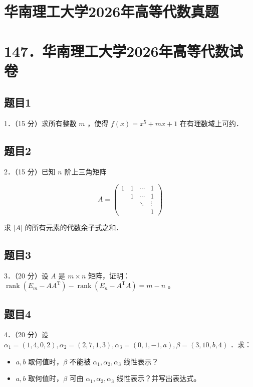 \documentclass{article}
\begin{document}
\section*{华南理工大学2026年高等代数真题}
\section*{147．华南理工大学2026年高等代数试卷}

\subsection{题目1}
1．（15 分）求所有整数 \(m\) ，使得 \(f(x)=x^{5}+m x+1\) 在有理数域上可约．

\subsection{题目2}
2．（15 分）已知 \(n\) 阶上三角矩阵

\[
A=\left(\begin{array}{cccc}
1 & 1 & \cdots & 1 \\
& 1 & \cdots & 1 \\
& & \ddots & \vdots \\
& & & 1
\end{array}\right)
\]

求 \(|A|\) 的所有元素的代数余子式之和．

\subsection{题目3}
3．（20 分）设 \(A\) 是 \(m \times n\) 矩阵，证明： \(\operatorname{rank}\left(E_{m}-A A^{\mathrm{T}}\right)-\operatorname{rank}\left(E_{n}-A^{\mathrm{T}} A\right)=m-n\) 。

\subsection{题目4}
4．（20 分）设 \(\alpha_{1}=(1,4,0,2), \alpha_{2}=(2,7,1,3), \alpha_{3}=(0,1,-1, a), \beta=(3,10, b, 4)\) ．求：

\begin{itemize}
  \item[（1）] \(a, b\) 取何值时，\(\beta\) 不能被 \(\alpha_{1}, \alpha_{2}, \alpha_{3}\) 线性表示？
  \item[（2）] \(a, b\) 取何值时，\(\beta\) 可由 \(\alpha_{1}, \alpha_{2}, \alpha_{3}\) 线性表示？并写出表达式。
\end{itemize}
\end{document}
